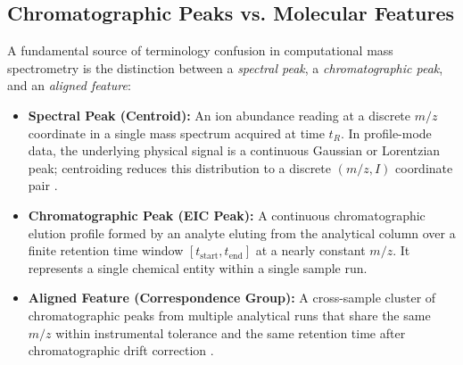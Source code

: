\documentclass[11pt,twoside,openright]{book}
\begin{document}
\subsection{Chromatographic Peaks vs. Molecular Features}

A fundamental source of terminology confusion in computational mass spectrometry is the distinction between a \textit{spectral peak}, a \textit{chromatographic peak}, and an \textit{aligned feature}:
\begin{itemize}
    \item \textbf{Spectral Peak (Centroid):} An ion abundance reading at a discrete $m/z$ coordinate in a single mass spectrum acquired at time $t_R$. In profile-mode data, the underlying physical signal is a continuous Gaussian or Lorentzian peak; centroiding reduces this distribution to a discrete $(m/z, I)$ coordinate pair \cite{chambers2012cross}.
    \item \textbf{Chromatographic Peak (EIC Peak):} A continuous chromatographic elution profile formed by an analyte eluting from the analytical column over a finite retention time window $[t_{\text{start}}, t_{\text{end}}]$ at a nearly constant $m/z$. It represents a single chemical entity within a single sample run.
    \item \textbf{Aligned Feature (Correspondence Group):} A cross-sample cluster of chromatographic peaks from multiple analytical runs that share the same $m/z$ within instrumental tolerance and the same retention time after chromatographic drift correction \cite{smith2006xcms}.
\end{itemize}
\end{document}
